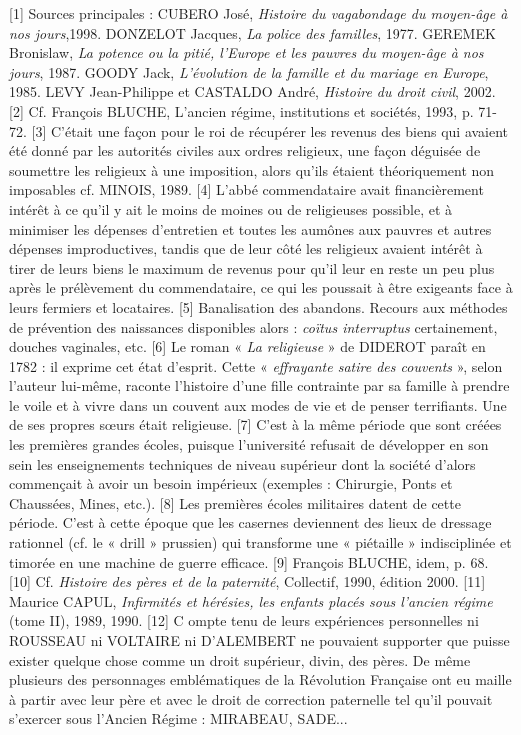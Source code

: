 [1] Sources principales : CUBERO José, \emph{Histoire du vagabondage du moyen-âge à nos jours},1998. DONZELOT Jacques, \emph{La police des familles}, 1977. GEREMEK Bronislaw, \emph{La potence ou la pitié, l'Europe et les pauvres du moyen-âge à nos jours}, 1987. GOODY Jack, \emph{L'évolution de la famille et du mariage en Europe}, 1985. LEVY Jean-Philippe et CASTALDO André, \emph{Histoire du droit civil}, 2002. 
[2] Cf. François BLUCHE, L'ancien régime, institutions et sociétés, 1993, p. 71-72.
[3] C'était une façon pour le roi de récupérer les revenus des biens qui avaient été donné par les autorités civiles aux ordres religieux, une façon déguisée de soumettre les religieux à une imposition, alors qu'ils étaient théoriquement non imposables
cf. MINOIS, 1989.
[4] L'abbé commendataire avait financièrement intérêt à ce qu'il y ait le moins de moines ou de religieuses possible, et à minimiser les dépenses d'entretien et toutes les aumônes aux pauvres et autres dépenses improductives, tandis que de leur côté les religieux avaient intérêt à tirer de leurs biens le maximum de revenus pour qu'il leur en reste un peu plus après le prélèvement du commendataire, ce qui les poussait à être exigeants face à leurs fermiers et locataires.
[5] Banalisation des abandons. Recours aux méthodes de prévention des naissances disponibles alors : \emph{coïtus interruptus} certainement, douches vaginales, etc. 
[6] Le roman « \emph{La religieuse} » de DIDEROT paraît en 1782 : il exprime cet état d'esprit. Cette « \emph{effrayante satire des couvents} », selon l'auteur lui-même, raconte l'histoire d'une fille contrainte par sa famille à prendre le voile et à vivre dans un couvent aux modes de vie et de penser terrifiants. Une de ses propres sœurs était religieuse.
[7] C'est à la même période que sont créées les premières grandes écoles, puisque l'université refusait de développer en son sein les enseignements techniques de niveau supérieur dont la société d'alors commençait à avoir un besoin impérieux (exemples : Chirurgie, Ponts et Chaussées, Mines, etc.).
[8] Les premières écoles militaires datent de cette période. C'est à cette époque que les casernes deviennent des lieux de dressage rationnel (cf. le « drill » prussien) qui transforme une « piétaille » indisciplinée et timorée en une machine de guerre efficace.
[9] François BLUCHE, idem, p. 68.
[10] Cf. \emph{Histoire des pères et de la paternité}, Collectif, 1990, édition 2000.
[11] Maurice CAPUL,\emph{ Infirmités et hérésies, les enfants placés sous l'ancien régime} (tome II), 1989, 1990.
[12] C ompte tenu de leurs expériences personnelles ni ROUSSEAU ni VOLTAIRE ni D'ALEMBERT ne pouvaient supporter que puisse exister quelque chose comme un droit supérieur, divin, des pères. De même plusieurs des personnages emblématiques de la Révolution Française ont eu maille à partir avec leur père et avec le droit de correction paternelle tel qu'il pouvait s'exercer sous l'Ancien Régime : MIRABEAU, SADE...
